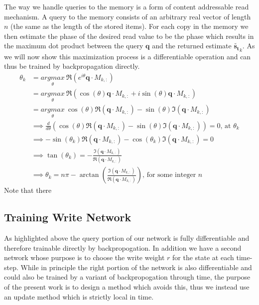 \documentclass{article}
\begin{document}
The way we handle queries to the memory is a form of content addressable read mechanism. A query to the memory consists of an arbitrary real vector of length $n$ (the same as the length of the stored items). For each copy in the memory we then estimate the phase of the desired read value to be the phase which results in the maximum dot product between the query $\pmb{q}$ and the returned estimate $\tilde{\pmb{s_t}}_{k}$. As we will now show this maximization process is a differentiable operation and can thus be trained by backpropagation directly.
\begin{align*}
\theta_k&=\underset{\theta}{argmax}\  \Re(e^{i\theta}\pmb{q}\cdot M_{k,:})\\
&=\underset{\theta}{argmax}\  \Re(\cos(\theta)\pmb{q}\cdot M_{k,:}+i\sin(\theta)\pmb{q}\cdot M_{k,:})\\
&=\underset{\theta}{argmax}\  \cos(\theta)\Re(\pmb{q}\cdot M_{k,:})-\sin(\theta)\Im(\pmb{q}\cdot M_{k,:})\\
&\implies \frac{d}{d\theta}\left(\cos(\theta)\Re(\pmb{q}\cdot M_{k,:})-\sin(\theta)\Im(\pmb{q}\cdot M_{k,:})\right)=0\text{, at }\theta_k\\
&\implies -\sin(\theta_k)\Re(\pmb{q}\cdot M_{k,:})-\cos(\theta_k)\Im(\pmb{q}\cdot M_{k,:})=0\\
&\implies \tan(\theta_k)=-\frac{\Im(\pmb{q}\cdot M_{k,:})}{\Re(\pmb{q}\cdot M_{k,:})}\\
&\implies \theta_k=n\pi-\arctan\left(\frac{\Im(\pmb{q}\cdot M_{k,:})}{\Re(\pmb{q}\cdot M_{k,:})}\right)\text{, for some integer }n
\end{align*}
Note that there 

\subsection*{Training Write Network}
As highlighted above the query portion of our network is fully differentiable and therefore trainable directly by backpropogation. In addition we have a second network whose purpose is to choose the write weight $r$ for the state at each time-step. While in principle the right portion of the network is also differentiable and could also be trained by a variant of backpropogation through time, the purpose of the present work is to design a method which avoids this, thus we instead use an update method which is strictly local in time.
\end{document}
